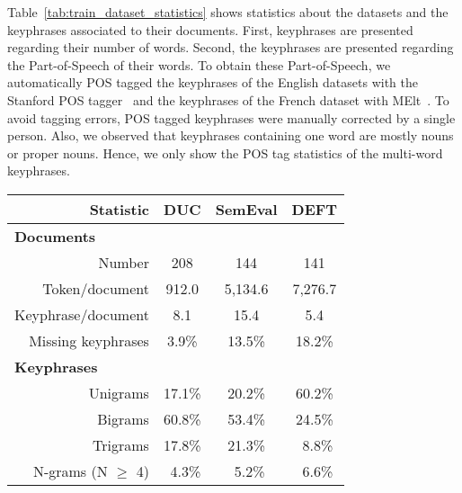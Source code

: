     Table~\ref{tab:train_dataset_statistics} shows statistics about the datasets
    and the keyphrases associated to their documents. First, keyphrases are presented
    regarding their number of words. Second, the keyphrases are presented
    regarding the Part-of-Speech of their words. To obtain these Part-of-Speech,
    we automatically POS tagged the keyphrases of the English datasets with the
    Stanford POS tagger~\cite{toutanova2003stanfordpostagger} and the keyphrases
    of the French dataset with MElt~\cite{denis2009melt}. To avoid tagging
    errors, POS tagged keyphrases were manually corrected by a single person.
    Also, we observed that keyphrases containing one word are mostly nouns or
    proper nouns. Hence, we only show the POS tag statistics of the multi-word
    keyphrases.
    \begin{table}
      \centering
      \begin{tabular}{lr|ccc}
        \toprule
        & \textbf{Statistic} & \textbf{DUC} & \textbf{SemEval} & \textbf{DEFT}\\
        \hline
        \multicolumn{2}{l|}{\textbf{Documents}}\\
        \multicolumn{2}{r|}{Number} & 208 & 144 & 141\\
        \multicolumn{2}{r|}{Token/document} & 912.0 & 5,134.6 & 7,276.7\\
        \multicolumn{2}{r|}{Keyphrase/document} & 8.1 & 15.4 & 5.4\\
        \multicolumn{2}{r|}{Missing keyphrases} & 3.9\% & 13.5\% & 18.2\%\\
        \hline
        \multicolumn{2}{l|}{\textbf{Keyphrases}}\\
        \multicolumn{2}{r|}{Unigrams} & 17.1\% & 20.2\% & 60.2\%\\
        \multicolumn{2}{r|}{Bigrams} & 60.8\% & 53.4\% & 24.5\%\\
        \multicolumn{2}{r|}{Trigrams} & 17.8\% & 21.3\% & $~~$8.8\%\\
        \multicolumn{2}{r|}{N-grams (N $\geq$ 4)} & $~~$4.3\% & $~~$5.2\% & $~~$6.6\%\\

\end{tabular}
\end{table}
